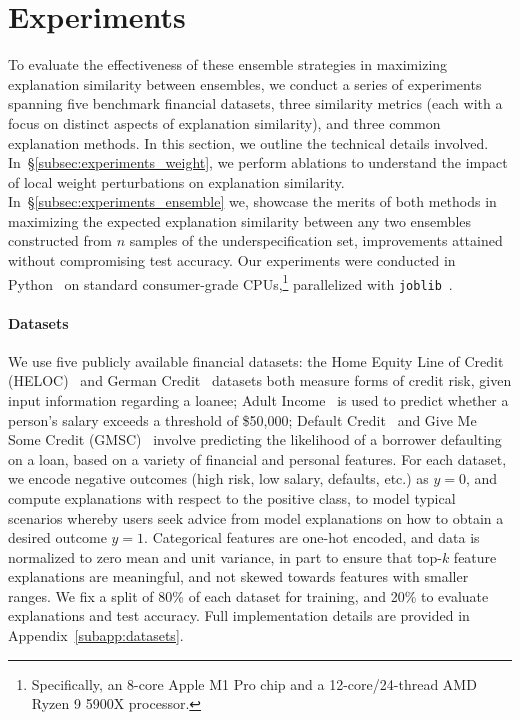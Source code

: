 \section{Experiments}
\label{sec:experiments}

To evaluate the effectiveness of these ensemble strategies in maximizing explanation similarity between ensembles, we conduct a series of experiments spanning five benchmark financial datasets, three similarity metrics (each with a focus on distinct aspects of explanation similarity), and three common explanation methods. In this section, we outline the technical details involved. In~\S\ref{subsec:experiments_weight}, we perform ablations to understand the impact of local weight perturbations on explanation similarity. In~\S\ref{subsec:experiments_ensemble} we, showcase the merits of both methods in maximizing the expected explanation similarity between any two ensembles constructed from $n$ samples of the underspecification set, improvements attained without compromising test accuracy. Our experiments were conducted in Python~\citep{van1995} on standard consumer-grade CPUs,\footnote{Specifically, an 8-core Apple M1 Pro chip and a 12-core/24-thread AMD Ryzen 9 5900X processor.} parallelized with \verb+joblib+~\citep{joblib2020}. 

\paragraph{Datasets} We use five publicly available financial datasets: the Home Equity Line of Credit (HELOC)~\citep{heloc} and German Credit~\cite{uci2017} datasets both measure forms of credit risk, given input information regarding a loanee; Adult Income~\citep{uci2017} is used to predict whether a person's salary exceeds a threshold of \$50,000; Default Credit~\citep{yeh2009} and Give Me Some Credit (GMSC)~\citep{gmsc} involve predicting the likelihood of a borrower defaulting on a loan, based on a variety of financial and personal features. For each dataset, we encode negative outcomes (high risk, low salary, defaults, etc.) as $y=0$, and compute explanations with respect to the positive class, to model typical scenarios whereby users seek advice from model explanations on how to obtain a desired outcome $y=1$. Categorical features are one-hot encoded, and data is normalized to zero mean and unit variance, in part to ensure that top-$k$ feature explanations are meaningful, and not skewed towards features with smaller ranges. We fix a split of 80\% of each dataset for training, and 20\% to evaluate explanations and test accuracy. Full implementation details are provided in Appendix~\ref{subapp:datasets}.

